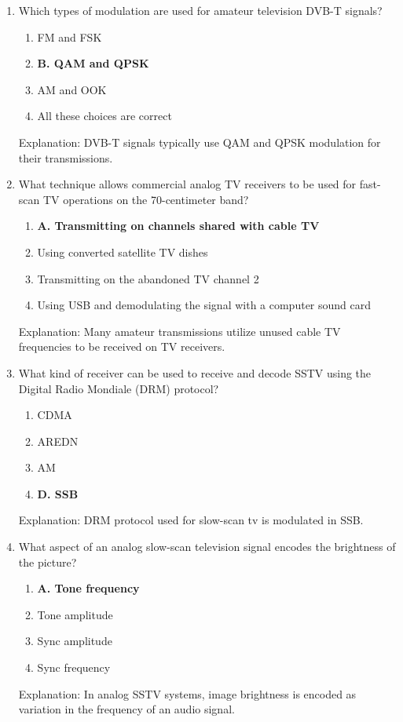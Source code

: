 \begin{enumerate}
   \item Which types of modulation are used for amateur television DVB-T signals?
      \begin{enumerate}
          \item  FM and FSK
          \item \textbf{B. QAM and QPSK}
         \item  AM and OOK
         \item  All these choices are correct
        \end{enumerate}
       \textcolor{myred}{Explanation:}
     DVB-T signals typically use QAM and QPSK modulation for their transmissions.
     
    \item What technique allows commercial analog TV receivers to be used for fast-scan TV operations on the 70-centimeter band?
       \begin{enumerate}
      \item \textbf{A. Transmitting on channels shared with cable TV}
        \item  Using converted satellite TV dishes
         \item  Transmitting on the abandoned TV channel 2
      \item  Using USB and demodulating the signal with a computer sound card
        \end{enumerate}
      \textcolor{myred}{Explanation:}
        Many amateur transmissions utilize unused cable TV frequencies to be received on TV receivers.
      
     \item What kind of receiver can be used to receive and decode SSTV using the Digital Radio Mondiale (DRM) protocol?
      \begin{enumerate}
       \item  CDMA
       \item  AREDN
      \item  AM
       \item \textbf{D. SSB}
      \end{enumerate}
       \textcolor{myred}{Explanation:}
        DRM protocol used for slow-scan tv is modulated in SSB.

    \item What aspect of an analog slow-scan television signal encodes the brightness of the picture?
      \begin{enumerate}
      \item \textbf{A. Tone frequency}
        \item  Tone amplitude
    \item  Sync amplitude
       \item  Sync frequency
        \end{enumerate}
       \textcolor{myred}{Explanation:}
        In analog SSTV systems, image brightness is encoded as variation in the frequency of an audio signal.


\end{enumerate}
